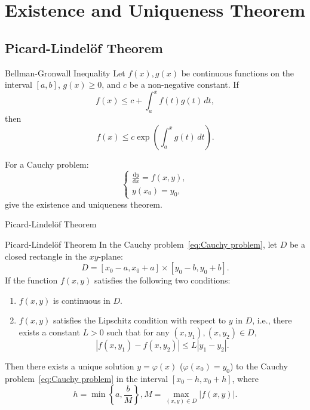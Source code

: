 \documentclass[11pt]{../../TexTemplate/elegantbook}
\begin{document}
\chapter{Existence and Uniqueness Theorem}
\section{Picard-Lindelöf Theorem}
\begin{theorem}{Bellman-Gronwall Inequality}
    Let \(f(x), g(x)\) be continuous functions on the interval \([a, b]\),
    \(g(x) \geqslant  0\), and \(c\) be a non-negative constant.
    If
    \[
    f(x) \leqslant  c + \int_{a}^{x} f(t) g(t) \, dt,
    \]
    then
    \[
    f(x) \leqslant  c \exp\left(\int_{a}^{x} g(t) \, dt\right).
    \]
\end{theorem}

For a Cauchy problem:
\begin{equation}\label{eq:Cauchy problem}
\begin{cases}
    \frac{\mathrm{d}y}{\mathrm{d}x} = f(x, y), \\
    y(x_0) = y_0,
\end{cases}
\end{equation}
give the existence and uniqueness theorem.

\begin{leftbarTitle}{Picard-Lindelöf Theorem}\end{leftbarTitle}
\begin{theorem}{Picard-Lindelöf Theorem}
    In the Cauchy problem~\eqref{eq:Cauchy problem},
    let \(D\) be a closed rectangle in the \(xy\)-plane: 
    \[
    D = [x_{0}-a, x_{0}+a] \times [y_{0}-b, y_{0}+b].
    \]
    If the function \(f(x, y)\) satisfies the following two conditions:
    \begin{enumerate}
        \item \(f(x, y)\) is continuous in \(D\).
        \item \(f(x, y)\) satisfies the Lipschitz condition with respect to \(y\) in \(D\), 
            i.e., there exists a constant \(L > 0\) such that for any \((x, y_1), (x, y_2) \in D\),
            \[
            |f(x, y_1) - f(x, y_2)| \leqslant  L |y_1 - y_2|.
            \]
    \end{enumerate}
    Then there exists a unique solution \(y = \varphi(x)\) (\(\varphi(x_0) = y_0\)) to the Cauchy problem~\eqref{eq:Cauchy problem}
    in the interval \([x_{0}-h, x_{0}+h]\), where
    \[
    h = \min\left\{a, \frac{b}{M}\right\}, M = \max_{(x, y) \in D} |f(x, y)|.
    \]
\end{theorem}
\end{document}
